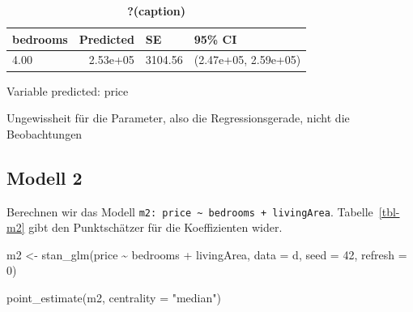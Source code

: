 \documentclass[
  a4paper,
  DIV=11]{scrreprt}
\newenvironment{Shaded}{\begin{snugshade}}{\end{snugshade}}
\newcommand{\AttributeTok}[1]{\textcolor[rgb]{0.40,0.45,0.13}{#1}}
\newcommand{\DecValTok}[1]{\textcolor[rgb]{0.68,0.00,0.00}{#1}}
\newcommand{\FunctionTok}[1]{\textcolor[rgb]{0.28,0.35,0.67}{#1}}
\newcommand{\NormalTok}[1]{\textcolor[rgb]{0.00,0.23,0.31}{#1}}
\newcommand{\OtherTok}[1]{\textcolor[rgb]{0.00,0.23,0.31}{#1}}
\newcommand{\SpecialCharTok}[1]{\textcolor[rgb]{0.37,0.37,0.37}{#1}}
\newcommand{\StringTok}[1]{\textcolor[rgb]{0.13,0.47,0.30}{#1}}
\theoremstyle{definition}
\theoremstyle{remark}
\begin{document}
\begin{table}

\caption{\label{tbl-m1-dons-new}\textbf{?(caption)}}\begin{minipage}[t]{\linewidth}

{\centering 

\begin{tabular}[t]{lrll}
\toprule
bedrooms & Predicted & SE & 95\% CI\\
\midrule
4.00 & 2.53e+05 & 3104.56 & (2.47e+05, 2.59e+05)\\
\bottomrule
\end{tabular}

}

\end{minipage}%
\newline
\begin{minipage}[t]{\linewidth}

{\centering 

Variable predicted: price

}

\end{minipage}%
\newline
\begin{minipage}[t]{\linewidth}

{\centering 

Ungewissheit für die Parameter, also die Regressionsgerade, nicht die
Beobachtungen

}

\end{minipage}%

\end{table}

\hypertarget{modell-2}{%
\subsection{Modell 2}\label{modell-2}}

Berechnen wir das Modell
\texttt{m2:\ price\ \textasciitilde{}\ bedrooms\ +\ livingArea}.
Tabelle~\ref{tbl-m2} gibt den Punktschätzer für die Koeffizienten wider.

\begin{Shaded}
\begin{Highlighting}[]
\NormalTok{m2 }\OtherTok{\textless{}{-}} \FunctionTok{stan\_glm}\NormalTok{(price }\SpecialCharTok{\textasciitilde{}}\NormalTok{ bedrooms }\SpecialCharTok{+}\NormalTok{ livingArea, }
               \AttributeTok{data =}\NormalTok{ d, }
               \AttributeTok{seed =} \DecValTok{42}\NormalTok{,}
               \AttributeTok{refresh =} \DecValTok{0}\NormalTok{)}

\FunctionTok{point\_estimate}\NormalTok{(m2, }\AttributeTok{centrality =} \StringTok{"median"}\NormalTok{)}
\end{Highlighting}
\end{Shaded}
\end{document}
